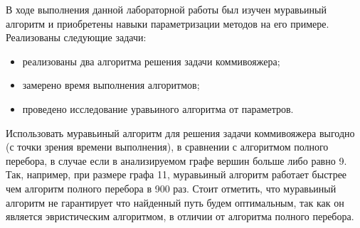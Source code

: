 \Conclusion
    В ходе выполнения данной лабораторной работы был изучен
    муравьиный алгоритм и приобретены навыки параметризации
    методов на его примере. 
    Реализованы следующие задачи:
    \begin{itemize}
        \item реализованы два алгоритма решения задачи коммивояжера;
        \item замерено время выполнения алгоритмов;
        \item проведено исследование уравьиного алгоритма от параметров.
    \end{itemize}
    
    Использовать муравьиный алгоритм для решения задачи коммивояжера выгодно (с точки зрения времени выполнения),
    в сравнении с алгоритмом полного перебора, в случае если в анализируемом графе вершин больше либо равно 9.
    Так, например, при размере графа 11, муравьиный алгоритм работает быстрее чем алгоритм полного перебора в 900 раз.
    Стоит отметить, что муравьиный алгоритм не гарантирует что найденный путь будем оптимальным,
    так как он является эвристическим алгоритмом, в отличии от алгоритма полного перебора.
    
